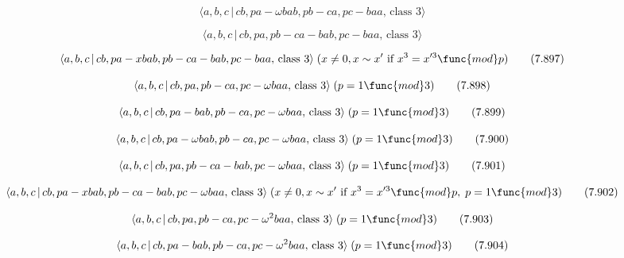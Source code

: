 \documentclass[10pt]{article}
\begin{document}
\begin{equation}
\langle a,b,c\,|\,cb,pa-\omega bab,pb-ca,pc-baa,\,\text{class }3\rangle 
\tag{7.895}
\end{equation}

\begin{equation}
\langle a,b,c\,|\,cb,pa,pb-ca-bab,pc-baa,\,\text{class }3\rangle  \tag{7.896}
\end{equation}

\begin{equation}
\langle a,b,c\,|\,cb,pa-xbab,pb-ca-bab,pc-baa,\,\text{class }3\rangle \;(x
\neq 0, x \sim x^{\prime }\text{ if }x^3=x^{\prime 3 }\func{mod} p) 
\tag{7.897}
\end{equation}

\begin{equation}
\langle a,b,c\,|\,cb,pa,pb-ca,pc-\omega baa,\,\text{class }3\rangle \;(p=1%
\func{mod}3)  \tag{7.898}
\end{equation}

\begin{equation}
\langle a,b,c\,|\,cb,pa-bab,pb-ca,pc-\omega baa,\,\text{class }3\rangle
\;(p=1\func{mod}3)  \tag{7.899}
\end{equation}

\begin{equation}
\langle a,b,c\,|\,cb,pa-\omega bab,pb-ca,pc-\omega baa,\,\text{class }%
3\rangle \;(p=1\func{mod}3)  \tag{7.900}
\end{equation}

\begin{equation}
\langle a,b,c\,|\,cb,pa,pb-ca-bab,pc-\omega baa,\,\text{class }3\rangle
\;(p=1\func{mod}3)  \tag{7.901}
\end{equation}

\begin{equation}
\langle a,b,c\,|\,cb,pa-xbab,pb-ca-bab,pc-\omega baa,\,\text{class }3\rangle
\;(x\neq 0,x \sim x^{\prime }\text{ if }x^3=x^{\prime 3}\func{mod}p,\;p=1%
\func{mod}3)  \tag{7.902}
\end{equation}

\begin{equation}
\langle a,b,c\,|\,cb,pa,pb-ca,pc-\omega ^{2}baa,\,\text{class }3\rangle
\;(p=1\func{mod}3)  \tag{7.903}
\end{equation}

\begin{equation}
\langle a,b,c\,|\,cb,pa-bab,pb-ca,pc-\omega ^{2}baa,\,\text{class }3\rangle
\;(p=1\func{mod}3)  \tag{7.904}
\end{equation}
\end{document}
